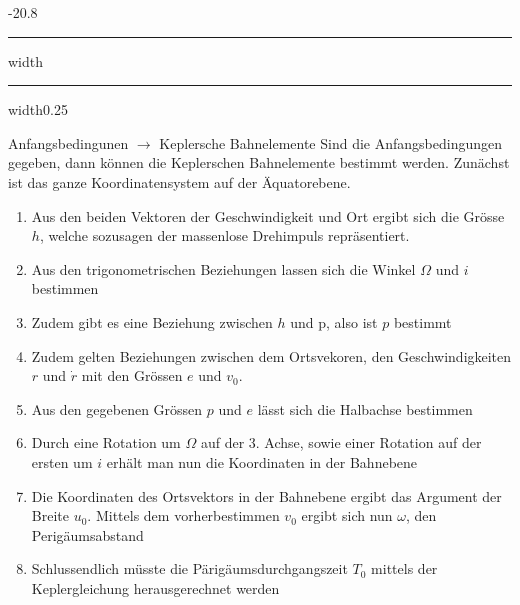 \documentclass[8pt, landscape, fleqn]{scrartcl}
\makeatletter
\renewcommand{\subsection}{\@startsection{subsection}{1}{0mm}%
{-2\baselineskip}{0.8\baselineskip}%
{\hrule depth 0.2pt width\columnwidth\hrule depth0.75pt
width0.25\columnwidth\vspace*{1.2em}\large\bfseries\rmfamily}}
\makeatother
\begin{document}
\begin{multicols*}{3}
\subsection{Anfangsbedingunen $\rightarrow$ Keplersche Bahnelemente}
Sind die Anfangsbedingungen gegeben, dann können die Keplerschen Bahnelemente bestimmt werden. Zunächst ist das ganze Koordinatensystem auf der Äquatorebene.
\begin{enumerate}
    \item Aus den beiden Vektoren der Geschwindigkeit und Ort ergibt sich die Grösse $h$, welche sozusagen der massenlose Drehimpuls repräsentiert.
    \item Aus den trigonometrischen Beziehungen lassen sich die Winkel $\Omega$ und $i$ bestimmen
    \item Zudem gibt es eine Beziehung zwischen $h$ und p, also ist $p$ bestimmt
    \item Zudem gelten Beziehungen zwischen dem Ortsvekoren, den Geschwindigkeiten $r$ und $\dot{r}$ mit den Grössen $e$ und $v_0$.
    \item Aus den gegebenen Grössen $p$ und $e$ lässt sich die Halbachse bestimmen
    \item Durch eine Rotation um $\Omega$ auf der 3. Achse, sowie einer Rotation auf der ersten um $i$ erhält man nun die Koordinaten in der Bahnebene
    \item Die Koordinaten des Ortsvektors in der Bahnebene ergibt das Argument der Breite $u_0$. Mittels dem vorherbestimmen $v_0$ ergibt sich nun $\omega$, den Perigäumsabstand
    \item Schlussendlich müsste die Pärigäumsdurchgangszeit $T_0$ mittels der Keplergleichung herausgerechnet werden
\end{enumerate}

\end{multicols*}
\end{document}
